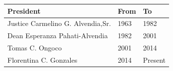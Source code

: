 \documentclass{article}
\begin{document}
\begin{tabular}{lll}
\toprule
President & From & To \\
\midrule
Justice Carmelino G. Alvendia,Sr. & 1963 & 1982 \\
Dean Esperanza Pahati-Alvendia & 1982 & 2001 \\
Tomas C. Ongoco & 2001 & 2014 \\
Florentina C. Gonzales & 2014 & Present \\
\bottomrule
\end{tabular}
\end{document}
